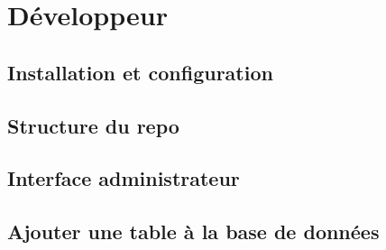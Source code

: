 \part{Développeur}

\chapter{Installation et configuration}



\chapter{Structure du repo}



\chapter{Interface administrateur}



\chapter{Ajouter une table à la base de données}


